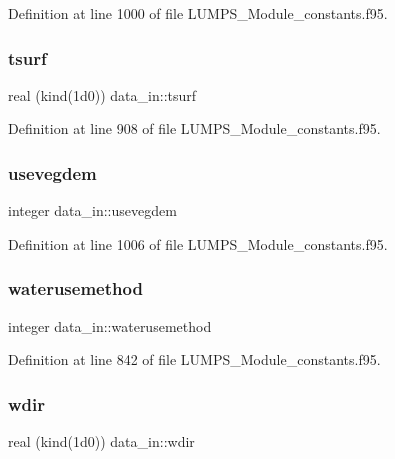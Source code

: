 Definition at line 1000 of file L\+U\+M\+P\+S\+\_\+\+Module\+\_\+constants.\+f95.

\mbox{\label{namespacedata__in_a743440f75d11d6596e13e18b78d7f531}} 
\subsubsection{\texorpdfstring{tsurf}{tsurf}}
{\footnotesize\ttfamily real (kind(1d0)) data\+\_\+in\+::tsurf}



Definition at line 908 of file L\+U\+M\+P\+S\+\_\+\+Module\+\_\+constants.\+f95.

\mbox{\label{namespacedata__in_a0d727fe2b398f97607c4ef74b9277286}} 
\subsubsection{\texorpdfstring{usevegdem}{usevegdem}}
{\footnotesize\ttfamily integer data\+\_\+in\+::usevegdem}



Definition at line 1006 of file L\+U\+M\+P\+S\+\_\+\+Module\+\_\+constants.\+f95.

\mbox{\label{namespacedata__in_ab3b82014d0bd4e04ce70642a274dd0dc}} 
\subsubsection{\texorpdfstring{waterusemethod}{waterusemethod}}
{\footnotesize\ttfamily integer data\+\_\+in\+::waterusemethod}



Definition at line 842 of file L\+U\+M\+P\+S\+\_\+\+Module\+\_\+constants.\+f95.

\mbox{\label{namespacedata__in_a42491a5943973e024de52949b4cdaa53}} 
\subsubsection{\texorpdfstring{wdir}{wdir}}
{\footnotesize\ttfamily real (kind(1d0)) data\+\_\+in\+::wdir}



